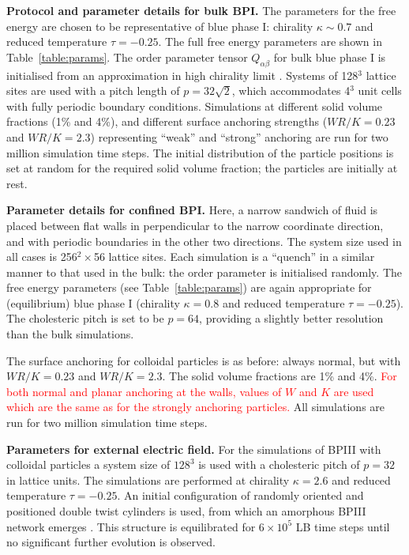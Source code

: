 \documentclass[12pt]{article}
\begin{document}
\medskip
\noindent
\textbf{Protocol and parameter details for bulk BPI.}
The parameters for the free energy are chosen to be representative
of blue phase I: chirality $\kappa \sim 0.7$ and reduced temperature
$\tau = -0.25$.
The full free energy parameters are shown in Table~\ref{table:params}.
The order parameter tensor $Q_{\alpha\beta}$ for bulk blue phase I is
initialised from an approximation in high chirality limit
\cite{mermin,henrichfield}. Systems of 128$^3$ lattice sites are
used with a pitch length of $p = 32\sqrt{2}$, which accommodates 4$^3$
unit cells with fully periodic boundary conditions.
Simulations at different solid volume fractions (1\% and 4\%), and different 
surface anchoring strengths ($WR/K = 0.23$ and $WR/K = 2.3$) representing
``weak'' and ``strong'' anchoring are run for two million simulation
time steps.
The initial distribution of the particle positions is set at random
for the required solid volume fraction; the particles are initially
at rest.

\medskip
\noindent
\textbf{Parameter details for confined BPI.}
Here, a narrow sandwich of fluid is placed between flat walls in
perpendicular to the narrow coordinate direction, and with periodic
boundaries in the other two directions. The system size used in all
cases is 256$^2 \times$56 lattice sites. Each simulation is a ``quench''
in a similar manner to that used in the bulk: the order parameter is
initialised randomly. The free energy parameters (see Table~\ref{table:params})
are again appropriate for (equilibrium) blue phase I
(chirality $\kappa = 0.8$ and
reduced temperature $\tau = -0.25$). The cholesteric pitch is set
to be $p = 64$, providing a slightly better resolution than the bulk
simulations.

The surface anchoring for colloidal particles is as before: always normal,
but with
$WR/K = 0.23$ and $WR/K = 2.3$. The solid volume fractions are
1\% and 4\%.
\textcolor{red}{For both normal and planar anchoring at the walls,
values of $W$ and $K$ are used which are the same as for the
strongly anchoring particles.}
All simulations are run for two million simulation
time steps.

\medskip
\noindent
\textbf{Parameters for external electric field.}
For the simulations of BPIII with colloidal particles a system size of
$128^3$ is used with a cholesteric pitch of $p=32$ in lattice units. 
The simulations are
performed at chirality $\kappa=2.6$ and reduced temperature $\tau=-0.25$.  
An initial configuration of
randomly oriented and positioned double twist cylinders is used,
from which an amorphous BPIII network emerges \cite{bp3}. This structure
is equilibrated for $6\times10^{5}$ LB time steps until no significant
further evolution is observed. 
\end{document}
